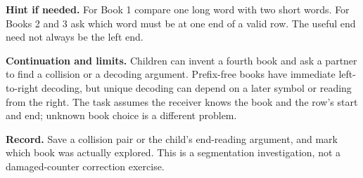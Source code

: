 \documentclass[11pt]{article}
\newcommand{\labelled}[2]{\textbf{#1} #2\par}
\begin{document}
\labelled{Hint if needed.}{For Book 1 compare one long word with two short words. For Books 2 and 3 ask which word must be at one end of a valid row. The useful end need not always be the left end.}
\labelled{Continuation and limits.}{Children can invent a fourth book and ask a partner to find a collision or a decoding argument. Prefix-free books have immediate left-to-right decoding, but unique decoding can depend on a later symbol or reading from the right. The task assumes the receiver knows the book and the row's start and end; unknown book choice is a different problem.}
\labelled{Record.}{Save a collision pair or the child's end-reading argument, and mark which book was actually explored. This is a segmentation investigation, not a damaged-counter correction exercise.}
\end{document}
